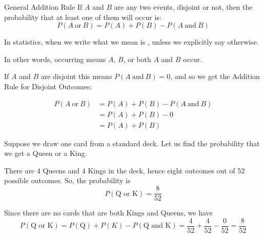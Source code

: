 \documentclass{beamer}
\newcommand{\prob}[1]{P\left(#1\right)}
\begin{document}
\begin{frame}
\begin{block}{General Addition Rule}
If $A$ and $B$ are any two events, disjoint or not, then the probability that at least one of them will occur is:
\begin{equation*}
\prob{A~\text{or}~B} = \prob{A}+\prob{B}-\prob{A~\text{and}~B}
\end{equation*}
\end{block}\pause

\begin{note}
In statistics, when we write  what we mean is , unless we explicitly say otherwise.

\vspace{1mm}
In other words,  occurring means $A$, $B$, or both $A$ and $B$ occur.
\end{note}\pause

\begin{note}
If $A$ and $B$ are disjoint this means $\prob{A~\text{and}~B}=0$, and so we get the Addition Rule for Disjoint Outcomes:

\vspace{-2mm}
\begin{equation*}
\begin{aligned}
\prob{A~\text{or}~B} &= \prob{A}+\prob{B}-\prob{A~\text{and}~B} \\
&= \prob{A}+\prob{B} - 0 \\
&= \prob{A}+\prob{B}
\end{aligned}
\end{equation*}
\end{note}
\end{frame}

\begin{frame}
\begin{example}
Suppose we draw one card from a standard deck. Let us find the probability that we get a Queen or a King.\pause

\vspace{2mm}
There are 4 Queens and 4 Kings in the deck, hence eight outcomes out of 52 possible outcomes. So, the probability is
\begin{equation*}
\prob{\text{Q or K}} = \dfrac{8}{52}
\end{equation*}\pause

\vspace{-3mm}
Since there are no cards that are both Kings and Queens, we have
\begin{equation*}
\prob{\text{Q or K}} = \prob{\text{Q}} + \prob{K} - \prob{\text{Q and K}} = \dfrac{4}{52}+\dfrac{4}{52}-\dfrac{0}{52} = \dfrac{8}{52}
\end{equation*}
\end{example}
\end{frame}
\end{document}
